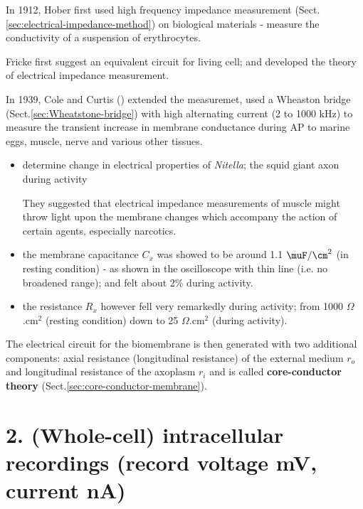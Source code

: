 In 1912, Hober first used high frequency impedance measurement
(Sect.\ref{sec:electrical-impedance-method}) on biological materials - measure
the conductivity of a suspension of erythrocytes.

Fricke first suggest an equivalent circuit for living cell; and developed the
theory of electrical impedance measurement.

In 1939, Cole and Curtis (\citep{cole1939}) extended the measuremet, used a
Wheaston bridge (Sect.\ref{sec:Wheatstone-bridge}) with high alternating
current (2 to 1000 kHz) to measure the transient increase in membrane
conductance during AP to marine eggs, muscle, nerve and various other tissues.
\begin{itemize}
  \item determine change in electrical properties of {\it Nitella}; the squid
  giant axon during activity

They suggested that electrical impedance measurements of muscle might throw
light upon the membrane changes which accompany the action of certain agents,
especially narcotics.
  
  \item the membrane capacitance $C_x$ was showed to be around 1.1 $\muF/\cm^2$
  (in resting condition) - as shown in the oscilloscope with thin line (i.e. no
  broadened range); and felt about 2\% during activity.
  
  \item the resistance $R_x$ however fell very remarkedly during activity; from
  1000 $\Omega$.cm$^2$ (resting condition) down to 25 $\Omega$.cm$^2$ (during
  activity).
\end{itemize}
The electrical circuit for the biomembrane is then generated with two additional
components: axial resistance (longitudinal resistance) of the external medium
$r_o$ and longitudinal resistance of the axoplasm $r_i$ and is called {\bf
core-conductor theory} (Sect.\ref{sec:core-conductor-membrane}).



\section{2. (Whole-cell) intracellular recordings (record voltage mV, current
nA)}
\label{sec:intracellular-recording}
\label{sec:voltage-clamp-techniques}

